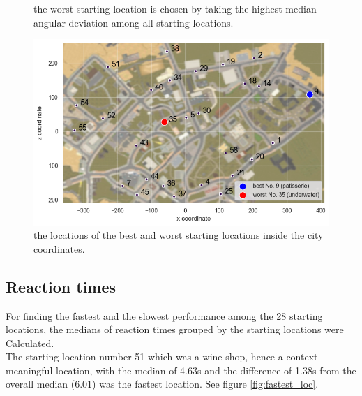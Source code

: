 \begin{figure}[!htb]
	\caption[Worst starting location based on angular deviation]{the worst starting location is chosen by taking the highest median angular deviation among all starting locations.}
\end{figure}
\label{fig:worst_location}

\begin{figure}[!htb]
	\centering
	\includegraphics[width=140mm]{figures/best_worst_starting_locations_map.png}
	\caption[Locations of best and worst starting locations in city]{the locations of the best and worst starting locations inside the city coordinates.}
	\label{fig:best_worst_locs}
\end{figure}


\subsection{Reaction times}

For finding the fastest and the slowest performance among the 28 starting locations, the medians of reaction times grouped by the starting locations were Calculated.\\
The starting location number 51 which was a wine shop, hence a context meaningful location, with the median of 4.63s and the difference of 1.38s from the overall median (6.01) was the fastest location. See figure \ref{fig:fastest_loc}.\\

